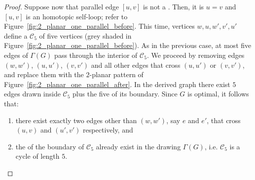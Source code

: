 \begin{proof}

Suppose now that parallel edge $[u,v]$ is not a \pe. Then, it is $u=v$ and 
$[u,v]$ is an homotopic self-loop; refer to 
Figure~\ref{fig:2_planar_one_parallel_before}. This time, vertices 
$w,u,w',v',u'$ define a \pp $\mathcal{C_5}$ of five vertices (grey shaded in 
Figure~\ref{fig:2_planar_one_parallel_before}). As in the previous case, at most 
five edges of $\Gamma(G)$ pass through the interior of $\mathcal{C}_5$. We 
proceed by removing  edges $(w,w')$, $(u,u')$, $(v,v')$ and all other edges that 
cross $(u,u')$ or $(v,v')$, and replace them with the $2$-planar pattern of 
Figure~\ref{fig:2_planar_one_parallel_after}. In the derived graph there exist 
$5$ edges drawn inside $\mathcal{C}_5$ plus the five \pes of its boundary. Since 
$G$ is optimal, it follows that:
\begin{enumerate}
\item there exist exactly two edges other than $(w,w')$, say $e$ and $e'$, that cross $(u,v)$ and $(u',v')$ respectively, and
\item  the \pes of the boundary of  $\mathcal{C}_5$ already exist in the drawing $\Gamma(G)$, i.e. $\mathcal{C}_5$ is a cycle of length $5$. 
\end{enumerate}


\end{proof}
